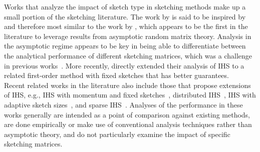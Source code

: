 Works that analyze the impact of sketch type in sketching methods make up a small portion of the sketching literature. The work by \citet{Lacotte:2020} is said to be inspired by and therefore most similar to the work by \citet{Dobriban:2019}, which appears to be the first in the literature to leverage results from asymptotic random matrix theory. Analysis in the asymptotic regime appears to be key in being able to differentiate between the analytical performance of different sketching matrices, which was a challenge in previous works~\citep{Choromanski:2017,Pilanci:2016,Raskutti:2016}. More recently, \citet{Lacotte:2020b} directly extended their analysis of IHS to a related first-order method with fixed sketches that has better guarantees.
\\

Recent related works in the literature also include those that propose extensions of IHS, e.g., IHS with momentum and fixed sketches~\citep{Ozaslan:2019}, distributed IHS~\citep{Derezinski:2020}, IHS with adaptive sketch sizes~\citep{Lacotte:2021}, and sparse IHS~\citep{Derezinski:2021}. Analyses of the performance in these works generally are intended as a point of comparison against existing methods, are done empirically or make use of conventional analysis techniques rather than asymptotic theory, and do not particularly examine the impact of specific sketching matrices.